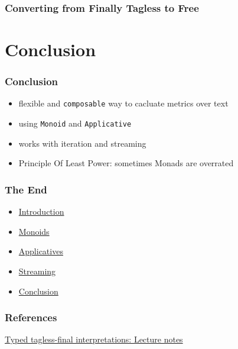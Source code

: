 \documentclass[aspectratio=169, hyperref={colorlinks, linkcolor=beamer@centricgreen}, urlcolor=links]{beamer}
\begin{document}
\begin{frame}
  \frametitle{Converting from Finally Tagless to Free}
\end{frame}

\section{Conclusion}\label{sec:conclusion}

\begin{frame}
  \frametitle{Conclusion}
  \begin{itemize}
  \item flexible and \texttt{composable} way to cacluate metrics over text
  \item using \texttt{Monoid} and \texttt{Applicative}
  \item works with iteration and streaming
  \item Principle Of Least Power: sometimes Monads are overrated
  \end{itemize}
\end{frame}

\begin{frame}
  \frametitle{The End}
  \begin{itemize}
  \item \hyperref[sec:introduction]{Introduction}
  \item \hyperref[sec:monoids]{Monoids}
  \item \hyperref[sec:applicatives]{Applicatives}
  \item \hyperref[sec:streaming]{Streaming}
  \item \hyperref[sec:conclusion]{Conclusion}
  \end{itemize}
  \vfill
\end{frame}

\begin{frame}
  \frametitle{References}
  \begin{center}
    \href{http://okmij.org/ftp/tagless-final/course/index.html}{Typed tagless-final interpretations: Lecture notes}
  \end{center}
\end{frame}

\appendix{}
\end{document}
